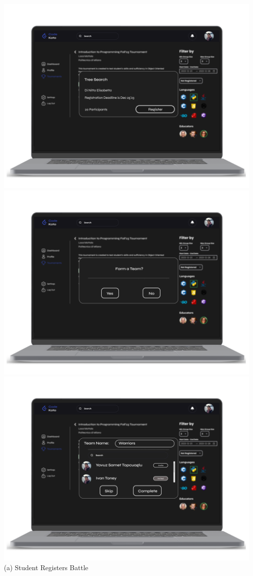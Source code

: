 \newpage
\begin{center}
\includegraphics[scale=0.13]{Images/ui-ux/student_battle_register/student_battle_register_1.png}
\includegraphics[scale=0.13]{Images/ui-ux/student_battle_register/student_battle_register_2.png}
\includegraphics[scale=0.13]{Images/ui-ux/student_battle_register/student_battle_register_3.png}
\\ (a) Student Registers Battle
\end{center}
